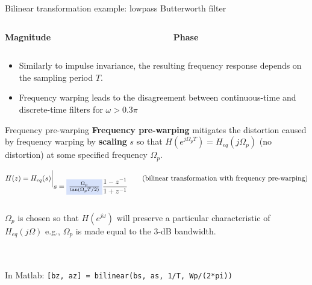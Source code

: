 \documentclass[10pt]{beamer}
\begin{document}
%
\begin{frame}{Bilinear transformation example: lowpass Butterworth filter}
\begin{columns}
	\begin{column}{0.5\textwidth}
		\textbf{Magnitude}
		\begin{center}
			\resizebox{\linewidth}{!}{}
		\end{center}
	\end{column}
	\begin{column}{0.5\textwidth}
		\textbf{Phase}
		\begin{center}
			\resizebox{\linewidth}{!}{}
		\end{center}
	\end{column}
\end{columns}
\begin{itemize}
	\item Similarly to impulse invariance, the resulting frequency response depends on the sampling period $T$.
	\item Frequency warping leads to the disagreement between continuous-time and discrete-time filters for $\omega > 0.3\pi$
\end{itemize}

\end{frame}

%
\begin{frame}{Frequency pre-warping}
\textbf{Frequency pre-warping} mitigates the distortion caused by frequency warping by {\color{blue2!50} \textbf{scaling}} $s$ so that $H(e^{j\Omega_p T}) = H_{eq}(j\Omega_p)$ (no distortion) at some specified frequency $\Omega_p$.



\begin{equation*}
H(z) = H_{eq}(s)\bigg|_{\displaystyle s = \tikz[baseline]{\node[fill=blue2!20,anchor=base] {$\frac{\Omega_p}{\tan(\Omega_pT/2)}$};}\frac{1 - z^{-1}}{1 + z^{-1}}} \tag{bilinear transformation with frequency pre-warping}
\end{equation*}
~\\
$\Omega_p$ is chosen so that $H(e^{j\omega})$ will preserve a particular characteristic of $H_{eq}(j\Omega)$ e.g., $\Omega_p$ is made equal to the $3$-dB bandwidth.


~\\
~\\
In Matlab: \texttt{[bz, az] = bilinear(bs, as, 1/T, Wp/(2*pi))}
\end{frame}
\end{document}
